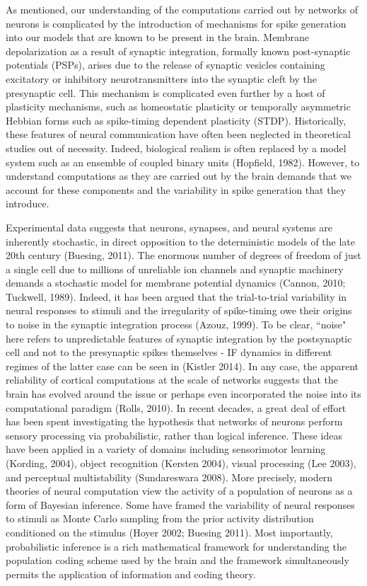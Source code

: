 \documentclass{ucetd}
\begin{document}
As mentioned, our understanding of the computations carried out by networks of neurons is complicated by the introduction of mechanisms for spike generation into our models that are known to be present in the brain. Membrane depolarization as a result of synaptic integration, formally known post-synaptic potentials (PSPs), arises due to the release of synaptic vesicles containing excitatory or inhibitory neurotransmitters into the synaptic cleft by the presynaptic cell. This mechanism is complicated even further by a host of plasticity mechanisms, such as homeostatic plasticity or temporally asymmetric Hebbian forms such as spike-timing dependent plasticity (STDP). Historically, these features of neural communication have often been neglected in theoretical studies out of necessity. Indeed, biological realism is often replaced by a model system such as an ensemble of coupled binary units (Hopfield, 1982). However, to understand computations as they are carried out by the brain demands that we account for these components and the variability in spike generation that they introduce.

Experimental data suggests that neurons, synapses, and neural systems are inherently stochastic, in direct opposition to the deterministic models of the late 20th century (Buesing, 2011). The enormous number of degrees of freedom of just a single cell due to millions of unreliable ion channels and synaptic machinery demands a stochastic model for membrane potential dynamics (Cannon, 2010; Tuckwell, 1989). Indeed, it has been argued that the trial-to-trial variability in neural responses to stimuli and the irregularity of spike-timing owe their origins to noise in the synaptic integration process (Azouz, 1999). To be clear, ``noise" here refers to unpredictable features of synaptic integration by the postsynaptic cell and not to the presynaptic spikes themselves - IF dynamics in different regimes of the latter case can be seen in (Kistler 2014). In any case, the apparent reliability of cortical computations at the scale of networks suggests that the brain has evolved around the issue or perhaps even incorporated the noise into its computational paradigm (Rolls, 2010). In recent decades, a great deal of effort has been spent investigating the hypothesis that networks of neurons perform sensory processing via probabilistic, rather than logical inference. These ideas have been applied in a variety of domains including sensorimotor learning (Kording, 2004), object recognition (Kersten 2004), visual processing (Lee 2003), and perceptual multistability (Sundareswara 2008). More precisely, modern theories of neural computation view the activity of a population of neurons as a form of Bayesian inference. Some have framed the variability of neural responses to stimuli as Monte Carlo sampling from the prior activity distribution conditioned on the stimulus (Hoyer 2002; Buesing 2011). Most importantly, probabilistic inference is a rich mathematical framework for understanding the population coding scheme used by the brain and the framework simultaneously permits the application of information and coding theory. 
\end{document}
